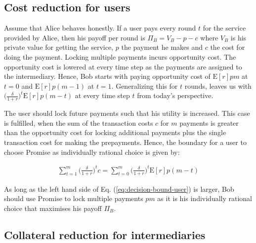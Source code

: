 \documentclass[runningheads]{llncs}
\newcommand{\sys}{Promise\xspace}
\begin{document}
\subsection{Cost reduction for users}
Assume that Alice behaves honestly.
If a user pays every round $t$ for the service provided by Alice, then his payoff per round is $\Pi_B = V_B - p - c$ where $V_B$ is his private value for getting the service, $p$ the payment he makes and $c$ the cost for doing the payment.
Locking multiple payments incurs opportunity cost.
The opportunity cost is lowered at every time step as the payments are assigned to the intermediary.
Hence, Bob starts with paying opportunity cost of $\mathrm{E}[r]pm$ at $t=0$ and $\mathrm{E}[r]p(m-1)$ at $t=1$.
Generalizing this for $t$ rounds, leaves us with $\big( \frac{\delta}{1+r} \big)^t \mathrm{E}[r]p(m-t)$ at every time step $t$ from today's perspective.

The user should lock future payments such that his utility is increased.
This case is fulfilled, when the sum of the transaction costs $c$ for $m$ payments is greater than the opportunity cost for locking additional payments plus the single transaction cost for making the prepayments.
Hence, the boundary for a user to choose \sys as individually rational choice is given by:

\begin{align}
\label{eq:decision-bound-user}
    \sum_{t=1}^m \big( \frac{\delta}{1+r} \big)^t c = \sum_{t=0}^m \big( \frac{\delta}{1+r} \big)^t \mathrm{E}[r]p(m-t)
\end{align}

As long as the left hand side of Eq. (\ref{eq:decision-bound-user}) is larger, Bob should use \sys to lock multiple payments $pm$ as it is his individually rational choice that maximises his payoff $\Pi_B$.

\subsection{Collateral reduction for intermediaries}
\end{document}
